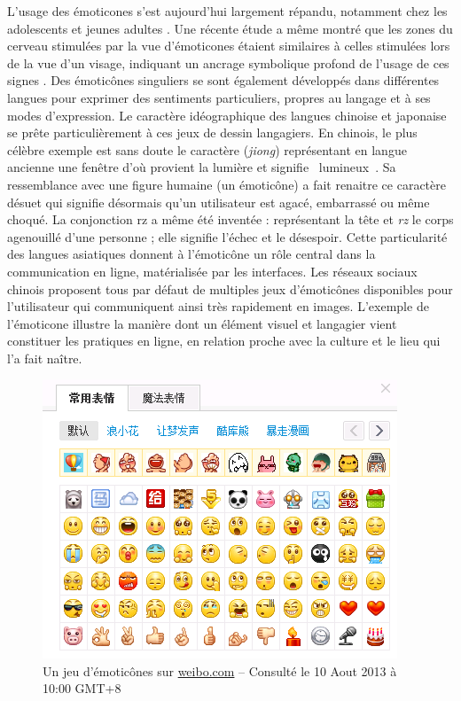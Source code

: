L{\textquoteright}usage des émoticones s{\textquoteright}est aujourd{\textquoteright}hui largement répandu, notamment chez les adolescents et jeunes adultes \citep{Derks2007a}. Une récente étude a même montré que les zones du cerveau stimulées par la vue d{\textquoteright}émoticones étaient similaires à celles stimulées lors de la vue d{\textquoteright}un visage, indiquant un ancrage symbolique profond de l{\textquoteright}usage de ces signes \citep{Churches2014}. Des émoticônes singuliers se sont également développés dans différentes langues pour exprimer des sentiments particuliers, propres au langage et à ses modes d{\textquoteright}expression. Le caractère idéographique des langues chinoise et japonaise se prête particulièrement à ces jeux de dessin langagiers. En chinois, le plus célèbre exemple est sans doute le caractère  (\textit{jiong}) représentant en langue ancienne une fenêtre d{\textquoteright}o\`u provient la lumière et signifie {\guillemotleft}~lumineux~{\guillemotright}. Sa ressemblance avec une figure humaine (un émoticône) a fait renaitre ce caractère désuet qui signifie désormais qu{\textquoteright}un utilisateur est agacé, embarrassé ou même choqué. La conjonction {\textquotedbl}rz{\textquotedbl} a même été inventée : représentant la tête et \textit{rz} le corps agenouillé d{\textquoteright}une personne ; elle signifie l{\textquoteright}échec et le désespoir. Cette particularité des langues asiatiques donnent à l{\textquoteright}émoticône un rôle central dans la communication en ligne, matérialisée par les interfaces. Les réseaux sociaux chinois proposent tous par défaut de multiples jeux d{\textquoteright}émoticônes disponibles pour l{\textquoteright}utilisateur qui communiquent ainsi très rapidement en images.  L{\textquoteright}exemple de l{\textquoteright}émoticone illustre la manière dont un élément visuel et langagier vient constituer les pratiques en ligne, en relation proche avec la culture et le lieu qui l{\textquoteright}a fait na\^itre. 

\begin{figure}[htpb]
    \centering
    \includegraphics[width=4.1669in,height=3.278in]{figures/chap2/chapitre2-img1.png}
    \caption[Un jeu d{\textquoteright}émoticônes de Weibo]{Un jeu d{\textquoteright}émoticônes sur \url{weibo.com} -- Consulté le 10 Aout 2013 à 10:00 GMT+8}
    \label{fig:emoticons-weibo}
\end{figure}

